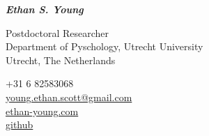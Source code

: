 \documentclass[
]{article}
\author{}
\date{\vspace{-2.5em}}
\begin{document}
\usetikzlibrary{calc}

\pagestyle{fancy}
\fancyhf{}
\rfoot{\textcolor{mygray}{\textit{\thepage}}}
\renewcommand{\headrulewidth}{0pt}

\begin{center}
  \Huge{\textbf{\textit{Ethan S. Young}}} \\
\end{center}

\vspace{2ex}

\begin{minipage}{5cm}
  \begin{center}
    Postdoctoral Researcher \\
    Department of Pyschology, Utrecht University \\
    Utrecht, The Netherlands \\
  \end{center}
\end{minipage}
\hfill
\begin{minipage}{5cm}
\end{minipage}
\hfill
\begin{minipage}{5cm}
  \faPhone{} +31 6 82583068  \\
  \faEnvelope{} \href{mailto:young.ethan.scott@gmail.com}{young.ethan.scott@gmail.com}\\
  \faHome{} \href{www.ethan-young.com}{ethan-young.com} \\
  \faGithub{} \href{https://github.com/ethan-young}{github}\\
\end{minipage}
\end{document}
